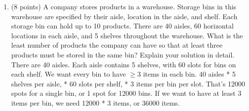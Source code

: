 \documentclass[12pt, letterpaper]{article}
\begin{document}
\begin{flushleft}
\begin{enumerate}
\begin{item}
    \smallskip
  \end{item}
  \item (8 points) A company stores products in a warehouse. Storage bins in this warehouse are specified by their aisle, location in the aisle, and shelf. Each storage bin can hold up to 10 products. There are 40 aisles, 60 horizontal locations in each aisle, and 5 shelves throughout the warehouse. What is the least number of products the company can have so that at least three products must be stored in the same bin? Explain your solution in detail. \\
    \smallskip
    There are 40 aisles. Each aisle contains 5 shelves, with 60 slots for bins on each shelf. We want every bin to have $\geq 3$ items in each bin. 40 aisles * 5 shelves per aisle, * 60 slots per shelf, * 3 items per bin per slot. That's 12000 spots for a single bin, or 1 spot for 12000 bins. If we want to have at least 3 items per bin, we need 12000 * 3 items, or 36000 items. \\
  \end{enumerate}
  
  
  
\end{flushleft}
\end{document}
